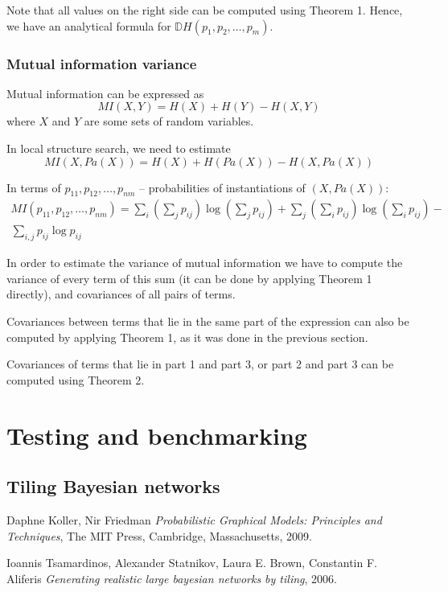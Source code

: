 \documentclass{article}
\begin{document}
Note that all values on the right side can be computed using Theorem 1. Hence, we have an analytical formula for $\mathbb{D}H(p_1, p_2, \ldots, p_m)$.

\subsubsection{Mutual information variance}
Mutual information can be expressed as  
\begin{equation}
MI(X, Y) = H(X) + H(Y) - H(X, Y)
\end{equation}
where $X$ and $Y$ are some sets of random variables. 

In local structure search, we need to estimate
\begin{equation}
MI(X, Pa(X)) = H(X) + H(Pa(X)) - H(X, Pa(X))
\end{equation}

In terms of $p_{11}, p_{12}, \ldots, p_{nm}$ -- probabilities of instantiations of $(X, Pa(X))$:
\begin{multline}
MI(p_{11}, p_{12}, \ldots, p_{nm}) = \sum_i{(\sum_j{p_{ij}}) \log(\sum_j{p_{ij}})} + \sum_j{(\sum_i{p_{ij}}) \log(\sum_i{p_{ij}})} - \\ \sum_{i,j}{p_{ij} \log p_{ij}}
\end{multline}

In order to estimate the variance of mutual information we have to compute the variance of every term of this sum (it can be done by applying Theorem 1 directly), and covariances of all pairs of terms.

Covariances between terms that lie in the same part of the expression can also be computed by applying Theorem 1, as it was done in the previous section.

Covariances of terms that lie in part 1 and part 3, or part 2 and part 3 can be computed using Theorem 2.

\section{Testing and benchmarking}
\subsection{Tiling Bayesian networks \cite{Tsamardinos2006}}

\begin{thebibliography}{9}
	
	Daphne Koller, Nir Friedman
	\emph{Probabilistic Graphical Models: Principles and Techniques},
	The MIT Press, Cambridge, Massachusetts,
	2009.
	
	Ioannis Tsamardinos, Alexander Statnikov, Laura E. Brown, Constantin F. Aliferis
	\emph{Generating realistic large bayesian networks by tiling},
	2006.
	
	
	
\end{thebibliography}
\end{document}
